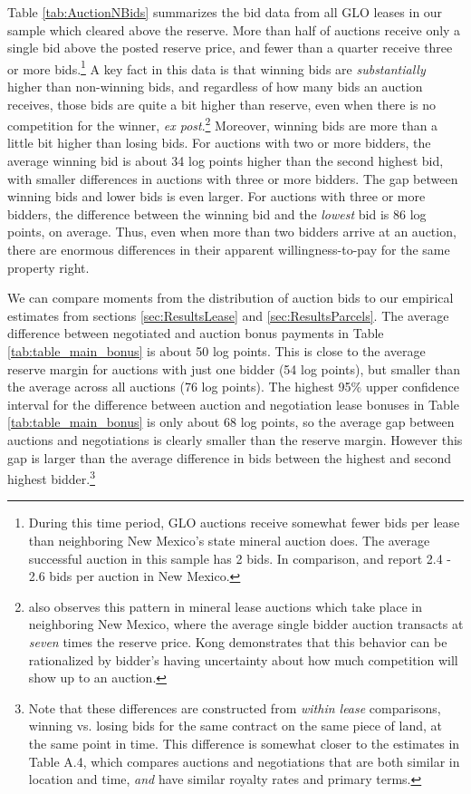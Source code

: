 Table \ref{tab:AuctionNBids} summarizes the bid data from all  GLO leases in our sample which cleared above the reserve. More than half of auctions receive only a single bid above the posted reserve price, and fewer than a quarter receive three or more bids.\footnote{During this time period, GLO auctions receive somewhat fewer bids per lease than neighboring New Mexico's state mineral auction does. The average successful auction in this sample has 2 bids.  In comparison, \cite{bhattacharya2018bidding} and \cite{kong_selective_2017} report 2.4 - 2.6 bids per auction in New Mexico.}  A key fact in this data is that winning bids are \textit{substantially} higher than non-winning bids, and regardless of how many bids an auction receives, those bids are quite a bit higher than reserve, even when there is no competition for the winner, \textit{ex post}.\footnote{\cite{kong_selective_2017} also observes this pattern in mineral lease auctions which take place in neighboring New Mexico, where the average single bidder auction transacts at \textit{seven} times the reserve price. Kong demonstrates that this behavior can be rationalized by bidder's having uncertainty about how much competition will show up to an auction.}  Moreover, winning bids are more than a little bit higher than losing bids.  For auctions with two or more bidders, the average winning bid is about 34 log points higher than the second highest bid, with smaller differences in auctions with three or more bidders.  The gap between winning bids and lower bids is even larger.  For auctions with three or more bidders, the difference between the winning bid and the \textit{lowest} bid is 86 log points, on average.  Thus, even when more than two bidders arrive at an auction, there are enormous differences in their apparent willingness-to-pay for the same property right. 

We can compare moments from the distribution of auction bids to our empirical estimates from sections \ref{sec:ResultsLease} and \ref{sec:ResultsParcels}. The average difference between negotiated and auction bonus payments in Table \ref{tab:table_main_bonus} is about 50 log points. This is close to the average reserve margin for auctions with just one bidder (54 log points), but smaller than the average across all auctions (76 log points). The highest 95\% upper confidence interval for the difference between auction and negotiation lease bonuses in Table \ref{tab:table_main_bonus} is only about 68 log points, so the average gap between auctions and negotiations is clearly smaller than the reserve margin. However this gap is larger than the average difference in bids between the highest and second highest bidder.\footnote{Note that these differences are constructed from \textit{within lease} comparisons, winning vs. losing bids for the same contract on the same piece of land, at the same point in time.  This difference is somewhat closer to the estimates in Table A.4, which compares auctions and negotiations that are both similar in location and time, \textit{and} have similar royalty rates and primary terms.} 

